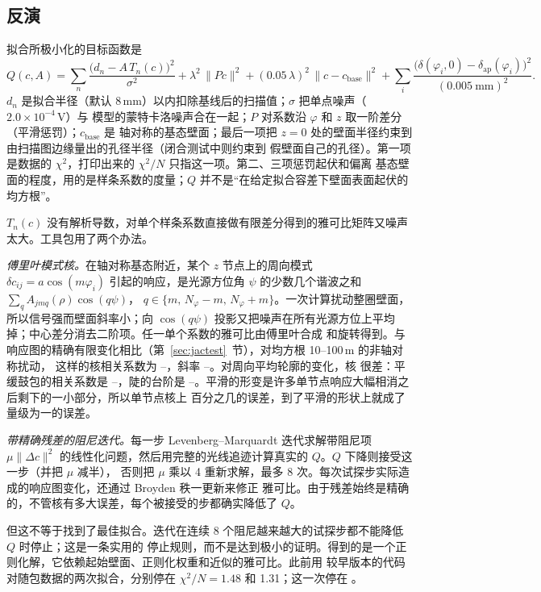 \documentclass[11pt,a4paper,fontset=fandol]{ctexart}
\newcommand{\um}{\,\textmu m}
\begin{document}
\subsection{反演}
\label{sec:inversion}

拟合所极小化的目标函数是
\[
  Q(c,A) = \sum_n \frac{\big(d_n-A\,T_n(c)\big)^2}{\sigma^2}
  + \lambda^2\,\lVert P c\rVert^2 + (0.05\,\lambda)^2\,\lVert c-c_\mathrm{base}\rVert^2
  + \sum_i \frac{\big(\delta(\varphi_i,0)-\delta_\mathrm{ap}(\varphi_i)\big)^2}{(0.005\ \mathrm{mm})^2}.
\]
$d_n$ 是拟合半径（默认 8\,mm）以内扣除基线后的扫描值；$\sigma$ 把单点噪声（$2.0\times10^{-4}$\,V）与
模型的蒙特卡洛噪声合在一起；$P$ 对系数沿 $\varphi$ 和 $z$ 取一阶差分（平滑惩罚）；$c_\mathrm{base}$ 是
轴对称的基态壁面；最后一项把 $z=0$ 处的壁面半径约束到由扫描图边缘量出的孔径半径（闭合测试中则约束到
假壁面自己的孔径）。第一项是数据的 $\chi^2$，打印出来的 $\chi^2/N$ 只指这一项。第二、三项惩罚起伏和偏离
基态壁面的程度，用的是样条系数的度量；$Q$ 并不是“在给定拟合容差下壁面表面起伏的均方根”。

$T_n(c)$ 没有解析导数，对单个样条系数直接做有限差分得到的雅可比矩阵又噪声太大。工具包用了两个办法。

\emph{傅里叶模式核。}在轴对称基态附近，某个 $z$ 节点上的周向模式 $\delta c_{ij}=a\cos(m\varphi_i)$
引起的响应，是光源方位角 $\psi$ 的少数几个谐波之和 $\sum_q A_{jmq}(\rho)\cos(q\psi)$，
$q\in\{m,\,N_\varphi-m,\,N_\varphi+m\}$。一次计算扰动整圈壁面，所以信号强而壁面斜率小；向
$\cos(q\psi)$ 投影又把噪声在所有光源方位上平均掉；中心差分消去二阶项。任一单个系数的雅可比由傅里叶合成
和旋转得到。与响应图的精确有限变化相比（第~\ref{sec:jactest}~节），对均方根 10--100\um{} 的非轴对称扰动，
这样的核相关系数为 \JacCorrMin--\JacCorrMax，斜率 \JacSlopeMin--\JacSlopeMax。对周向平均轮廓的变化，核
很差：平缓鼓包的相关系数是 \JacBumpCorrMin--\JacBumpCorrMax，陡的台阶是
\JacStepCorrMin--\JacStepCorrMax。平滑的形变是许多单节点响应大幅相消之后剩下的一小部分，所以单节点核上
百分之几的误差，到了平滑的形状上就成了量级为一的误差。

\emph{带精确残差的阻尼迭代。}每一步 Levenberg--Marquardt 迭代求解带阻尼项 $\mu\lVert\Delta c\rVert^2$
的线性化问题，然后用完整的光线追迹计算真实的 $Q$。$Q$ 下降则接受这一步（并把 $\mu$ 减半），
否则把 $\mu$ 乘以 4 重新求解，最多 8 次。每次试探步实际造成的响应图变化，还通过 Broyden 秩一更新来修正
雅可比。由于残差始终是精确的，不管核有多大误差，每个被接受的步都确实降低了 $Q$。

但这不等于找到了最佳拟合。迭代在连续 8 个阻尼越来越大的试探步都不能降低 $Q$ 时停止；这是一条实用的
停止规则，而不是达到极小的证明。得到的是一个正则化解，它依赖起始壁面、正则化权重和近似的雅可比。此前用
较早版本的代码对随包数据的两次拟合，分别停在 $\chi^2/N=1.48$ 和 1.31；这一次停在 \ChiTwo。
\end{document}

